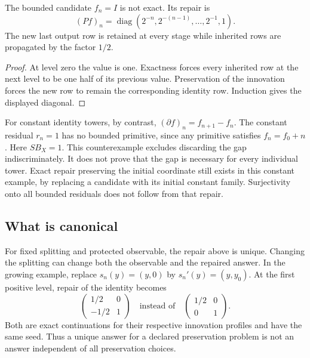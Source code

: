 \begin{example}\label{KS22}
The bounded candidate \(f_n=I\) is not exact. Its repair is
\[
 (Pf)_n=\operatorname{diag}(2^{-n},2^{-(n-1)},\ldots,2^{-1},1).
\]
The new last output row is retained at every stage while inherited rows are propagated by the factor \(1/2\).
\end{example}
\begin{proof}
At level zero the value is one. Exactness forces every inherited row at the next level to be one half of its previous value. Preservation of the innovation forces the new row to remain the corresponding identity row. Induction gives the displayed diagonal.
\end{proof}
For constant identity towers, by contrast, \((\partial f)_n=f_{n+1}-f_n\). The constant residual \(r_n=1\) has no bounded primitive, since any primitive satisfies \(f_n=f_0+n\). Here \(SB_X=1\). This counterexample excludes discarding the gap indiscriminately. It does not prove that the gap is necessary for every individual tower. Exact repair preserving the initial coordinate still exists in this constant example, by replacing a candidate with its initial constant family. Surjectivity onto all bounded residuals does not follow from that repair.

\subsection{What is canonical}
For fixed splitting and protected observable, the repair above is unique. Changing the splitting can change both the observable and the repaired answer. In the growing example, replace \(s_n(y)=(y,0)\) by \(s_n'(y)=(y,y_0)\). At the first positive level, repair of the identity becomes
\[
 \begin{pmatrix}1/2&0\\-1/2&1\end{pmatrix}
 \quad\text{instead of}\quad
 \begin{pmatrix}1/2&0\\0&1\end{pmatrix}.
\]
Both are exact continuations for their respective innovation profiles and have the same seed. Thus a unique answer for a declared preservation problem is not an answer independent of all preservation choices.



\label{sec:cascade}

